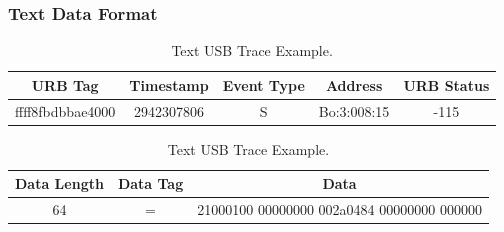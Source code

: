 \subsubsection{Text Data Format}
\begin{table}
\centering
\begin{tabular}{|c|c|c|c|c|}
\hline
URB Tag & Timestamp & Event Type & Address & URB Status\\
\hline
ffff8fbdbbae4000 & 2942307806 & S & Bo:3:008:15 & -115\\ 
\hline
\end{tabular}
\begin{tabular}{|c|c|c|}
\hline
Data Length & Data Tag & Data\\
\hline
64 & = & 21000100 00000000 002a0484 00000000 000000\\
\hline
\end{tabular}
\caption{Text USB Trace Example.}
\end{table}

